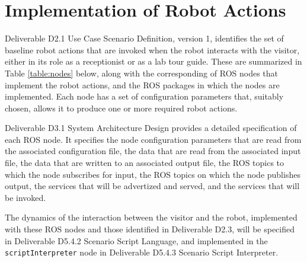 \documentclass{CSSRforAfrica}
\begin{document}
\newpage
 
 
\pagebreak
\tableofcontents
\newpage


\section{Implementation of Robot Actions}
Deliverable D2.1 Use Case Scenario Definition, version 1, identifies the set of baseline robot actions that are invoked when the robot interacts with the visitor, either in its role as a receptionist or as a lab tour guide.   These are summarized in Table \ref{table:nodes} below, along with the corresponding of ROS nodes that implement the robot actions, and the ROS packages in which the nodes are implemented.  Each node has a set of  configuration parameters that, suitably chosen, allows it to produce one or more required robot actions. 

Deliverable D3.1 System Architecture Design provides a detailed specification of each ROS node. It specifies the node configuration parameters that are read from the associated configuration file, the data that are read from the associated input file, the data that are written to an associated output file, the ROS topics to which the node subscribes for input,  the ROS topics on which the node publishes output, the services that will be advertized and served, and the services that will be invoked.

The dynamics of the interaction between the visitor and the robot, implemented with these  ROS nodes and those identified in Deliverable D2.3, will be specified in Deliverable D5.4.2 Scenario Script Language, and implemented in the {\small \verb+scriptInterpreter+} node in Deliverable D5.4.3 Scenario Script Interpreter.
\end{document}
